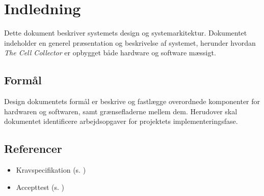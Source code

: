 \section{Indledning}
Dette dokument beskriver systemets design og systemarkitektur. Dokumentet indeholder en generel præsentation og beskrivelse af systemet, herunder hvordan \textit{The Cell Collector} er opbygget både hardware og software mæssigt.


\subsection{Formål}
Design dokumentets formål er beskrive og fastlægge overordnede komponenter for hardwaren og softwaren, samt grænsefladerne mellem dem.  
Herudover skal dokumentet identificere arbejdsopgaver for projektets implementeringsfase. 

\subsection{Referencer}
\begin{itemize}
\item Kravspecifikation (s. \pageref{ch:ks})
\item Accepttest (s. \pageref{ch:at})
\end{itemize}
